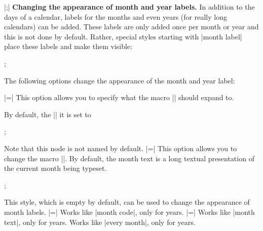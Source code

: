\begin{command}{\calendar {}|;|}
  \medskip
  \textbf{Changing the appearance of month and year labels.}
  In addition to the days of a calendar, labels for the months and
  even years (for really long calendars) can be added. These labels
  are only added once per month or year and this is not done by
  default. Rather, special styles starting with |month label|
  place these labels and make them visible:
\begin{codeexample}[]
\tikz \calendar[dates=2000-01-01 to 2000-02-last,week list,
                month label above centered];
\end{codeexample}

  The following options change the appearance of the month and year
  label:
  \begin{itemize}
    |=|
    This option allows you to specify what the macro |\tikzmonthcode|
    should expand to.

    By default, the |\tikzmonthcode| it is set to
\begin{codeexample}
;
\end{codeexample}
    Note that this node is not named by default.
    |=|
    This option allows you to change the macro |\tikzmonthtext|. By
    default, the month text is a long textual presentation of the
    current month being typeset. 
\begin{codeexample}
\tikz \calendar[dates=2000-01-01 to 2000-01-31,week list,
                month label above centered,  
                month text=\textcolor{red}{\%mt} \%y-];
\end{codeexample}
    This style, which is empty by default, can be used to change the
    appearance of month labels.
    |=| Works like |month code|,
    only for years.
    |=| Works like |month text|,
    only for years.
     Works like |every month|,
    only for years.
  \end{itemize}
  

\end{command}
